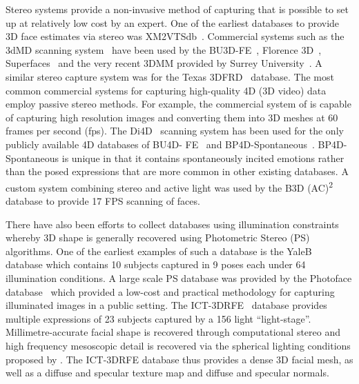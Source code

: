 Stereo systems provide a non-invasive method of capturing that is possible to
set up at relatively low cost by an expert. One of the earliest databases to
provide 3D face estimates via stereo was XM2VTSdb~\cite{messer1999xm2vtsdb}.
Commercial systems such as the 3dMD scanning system~\cite{3dmd} have been used
by the BU3D-FE~\cite{Yin:2006cc}, Florence 3D~\cite{bagdanov2011florence},
Superfaces~\cite{berretti2012superfaces} and the very recent 3DMM provided by
Surrey University~\cite{Huber:F5Dca9zy}. A similar stereo capture system was
for the Texas 3DFRD~\cite{gupta2010anthropometric} database. The most common
commercial systems for capturing high-quality 4D (3D video) data employ passive
stereo methods. For example, the commercial
system of \citet{di4d} is capable of capturing high resolution images and
converting them into 3D meshes at 60 frames per second (fps).
The Di4D~\cite{di4d} scanning system
has been used for the only publicly available 4D databases of BU4D-
FE~\cite{yin2008high} and BP4D-Spontaneous~\cite{Zhang:2014id}. BP4D-Spontaneous
is unique in that it contains spontaneously incited emotions rather than the
posed expressions that are more common in other existing databases. A custom
system combining stereo and active light was used by the B3D
(AC)\textsuperscript{2}~\cite{weise2007fast,fanelli2013random} database to
provide 17 FPS scanning of faces.

There have also been efforts to collect databases using illumination constraints
whereby 3D shape is generally recovered using
Photometric Stereo (PS)~\cite{woodham1980photometric}
algorithms. One of the earliest examples of such a database is the
YaleB~\cite{georghiades2001fromfew} database which contains 10 subjects captured in
9 poses each under 64 illumination conditions. A large scale PS database was
provided by the Photoface database~\cite{zafeiriou2013photoface} which provided a low-cost
and practical methodology for capturing illuminated images in a public setting.
The ICT-3DRFE~\cite{stratou2012exploring} database provides multiple expressions
of 23 subjects captured by a 156 light ``light-stage''. Millimetre-accurate
facial shape is recovered through computational stereo and high frequency
mesoscopic detail is recovered via the spherical lighting conditions proposed
by \citet{ma2007rapid}. The ICT-3DRFE database thus provides a dense
3D facial mesh, as well as a diffuse and specular texture map and diffuse and
specular normals.
